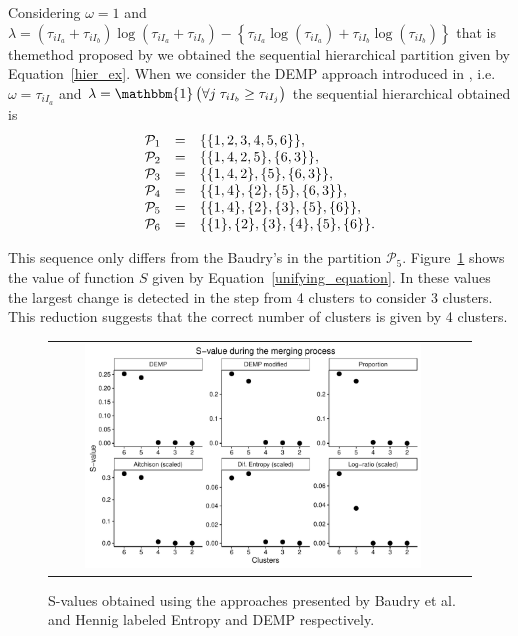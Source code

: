 \documentclass[10pt, a4paper]{article}
\begin{document}
\begin{spacing}{1.9}
Considering $\omega = 1$ and $\lambda = (\tau_{iI_a}+\tau_{iI_b}) \log(\tau_{iI_a} + \tau_{iI_b}) - \left\{ \tau_{iI_a} \log(\tau_{iI_a}) + \tau_{iI_b} \log(\tau_{iI_b}) \right\}$ that is themethod proposed by \cite{baudry2010combining} we obtained the sequential hierarchical partition given by Equation~\ref{hier_ex}. When we consider  the DEMP approach introduced in \citep{hennig2010methods}, i.e. $\omega = \tau_{i I_a}$ and $\lambda = \mathbbm{1}\left( \forall j\; \tau_{i I_{b}} \geq \tau_{iI_j} \right)$ the sequential hierarchical obtained is
\begin{equation}
\begin{array}{r c l}
\mathcal{P}_1 &=& \{\{1, 2, 3, 4, 5, 6\}\}, \\
\mathcal{P}_2 &=& \{\{1, 4, 2, 5\}, \{6, 3\} \},  \\
\mathcal{P}_3 &=& \{\{1, 4, 2\}, \{5\}, \{6, 3\} \}, \\
\mathcal{P}_4 &=& \{\{1, 4\},\{2\}, \{5\}, \{6, 3\} \}, \\
\mathcal{P}_5 &=& \{\{1, 4\},\{2\}, \{3\},\{5\},\{6\} \},\\
\mathcal{P}_6 &=& \{\{1\},\{2\},\{3\},\{4\},\{5\},\{6\}\}.
\end{array}
\end{equation}

This sequence only differs from the Baudry's in the partition $\mathcal{P}_5$.  Figure~\ref{gaussian_Svalues} shows the value of function $S$ given by Equation~\ref{unifying_equation}. In these values the largest change is detected in the step from 4 clusters to consider 3 clusters. This reduction suggests that the correct number of clusters is given by 4 clusters.
\begin{figure}[t]
\begin{center}
\begin{tabular}{cc}
  \includegraphics[width=0.85\textwidth]{figures/gaussian_Svalues.pdf} \\
 \end{tabular}
 \caption{S-values obtained using the approaches presented by Baudry et al. and Hennig labeled Entropy and DEMP respectively.}\label{gaussian_Svalues}
\end{center}
\end{figure}


\end{spacing}
\end{document}
